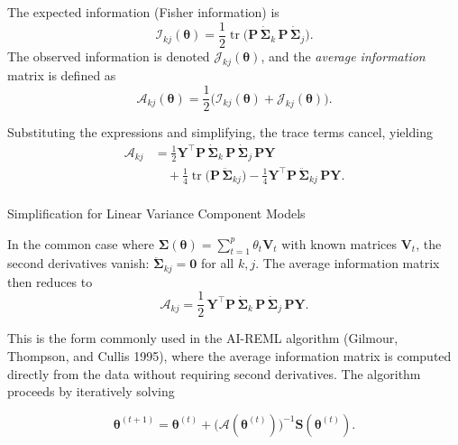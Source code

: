 \documentclass[
  letterpaper,
  DIV=11,
  numbers=noendperiod]{scrartcl}
\makeatletter
\let\oldparagraph\paragraph
\renewcommand{\paragraph}{
    \@ifstar
      \xxxParagraphStar
      \xxxParagraphNoStar
  }
\newcommand{\xxxParagraphStar}[1]{\oldparagraph*{#1}\mbox{}}
\newcommand{\xxxParagraphNoStar}[1]{\oldparagraph{#1}\mbox{}}
\makeatother
\begin{document}
The expected information (Fisher information) is \begin{equation}
\mathcal{I}_{kj}(\symbf{\theta}) = \frac12 \operatorname{tr}\!\big( \symbf{P}\,\dot{\symbf{\Sigma}}_k\,\symbf{P}\,\dot{\symbf{\Sigma}}_j \big).
\end{equation} The observed information is denoted
\(\mathcal{J}_{kj}(\symbf{\theta})\), and the \emph{average information}
matrix is defined as \begin{equation}
\mathcal{A}_{kj}(\symbf{\theta}) = \frac12 \Big( \mathcal{I}_{kj}(\symbf{\theta}) + \mathcal{J}_{kj}(\symbf{\theta}) \Big).
\end{equation}

Substituting the expressions and simplifying, the trace terms cancel,
yielding \begin{align}
\mathcal{A}_{kj} &= \frac12 \symbf{Y}^\top \symbf{P}\,\dot{\symbf{\Sigma}}_k\,\symbf{P}\,\dot{\symbf{\Sigma}}_j\,\symbf{P} \symbf{Y} \\
&\quad + \frac14 \operatorname{tr}\!\big( \symbf{P}\,\ddot{\symbf{\Sigma}}_{kj} \big)
- \frac14 \symbf{Y}^\top \symbf{P}\,\ddot{\symbf{\Sigma}}_{kj}\,\symbf{P}\symbf{Y}.
\end{align}

\paragraph{Simplification for Linear Variance Component
Models}\label{simplification-for-linear-variance-component-models}

In the common case where
\(\symbf{\Sigma}(\symbf{\theta}) = \sum_{t=1}^p \theta_t \symbf{V}_t\)
with known matrices \(\symbf{V}_t\), the second derivatives vanish:
\(\ddot{\symbf{\Sigma}}_{kj} = \symbf{0}\) for all \(k,j\). The average
information matrix then reduces to \begin{equation}
\label{eq-AI}
\boxed{
\mathcal{A}_{kj} = \frac12 \,\symbf{Y}^\top \symbf{P}\,\dot{\symbf{\Sigma}}_k\,\symbf{P}\,\dot{\symbf{\Sigma}}_j\,\symbf{P} \symbf{Y}
}.
\end{equation}

This is the form commonly used in the AI-REML algorithm (Gilmour,
Thompson, and Cullis 1995), where the average information matrix is
computed directly from the data without requiring second derivatives.
The algorithm proceeds by iteratively solving

\begin{equation}
\symbf{\theta}^{(t+1)} = \symbf{\theta}^{(t)} + \big( \mathcal{A}(\symbf{\theta}^{(t)}) \big)^{-1} \symbf{S}(\symbf{\theta}^{(t)}).
\end{equation}
\end{document}
